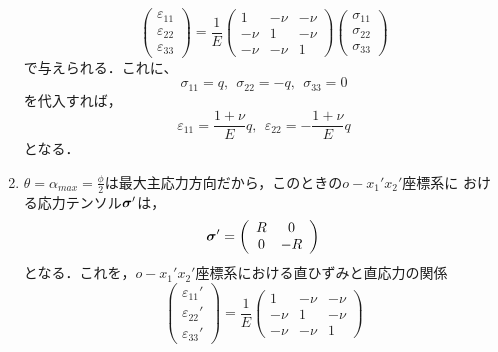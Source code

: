\documentclass[10pt,a4j]{jarticle}
\begin{document}
\begin{enumerate}
	\begin{equation}
		\left(
		\begin{array}{c}
			\varepsilon_{11} \\
			\varepsilon_{22} \\
			\varepsilon_{33}
		\end{array}
		\right)
		=
		\frac{1}{E}
		\left(
		\begin{array}{ccc}
			1 & -\nu & -\nu \\
			-\nu & 1 & -\nu \\
			-\nu & -\nu & 1 
		\end{array}
		\right)
		\left(
		\begin{array}{c}
			\sigma_{11} \\
			\sigma_{22} \\
			\sigma_{33}
		\end{array}
		\right)
		\label{eqn:Hooke}
	\end{equation}
	で与えられる．これに、
	\begin{equation}
		\sigma_{11}=q, \ \ \sigma_{22}=-q, \ \ \sigma_{33}=0
	\end{equation}
	を代入すれば，
	\begin{equation}
		\varepsilon_{11}=\frac{1+\nu}{E}q, \ \ 
		\varepsilon_{22}=-\frac{1+\nu}{E}q
	\end{equation}
	となる．
\item
	$\theta=\alpha_{max}=\frac{\phi}{2}$は最大主応力方向だから，このときの$o-x_1'x_2'$座標系に
	おける応力テンソル$\mbox{\boldmath $\sigma$}'$は，
	\begin{equation}
		\mbox{\boldmath $\sigma$}'=\left( 
		\begin{array}{cc}
			R & 0 \\
			0 & -R 
		\end{array}
		\right)
		\label{eqn:sigd}
	\end{equation}
	となる．これを，$o-x_1'x_2'$座標系における直ひずみと直応力の関係
	\begin{equation}
		\left(
		\begin{array}{c}
			\varepsilon_{11}' \\
			\varepsilon_{22}' \\
			\varepsilon_{33}'
		\end{array}
		\right)
		=
		\frac{1}{E}
		\left(
		\begin{array}{ccc}
			1 & -\nu & -\nu \\
			-\nu & 1 & -\nu \\
			-\nu & -\nu & 1 
		\end{array}
		\right)

\end{equation}
\end{enumerate}
\end{document}
